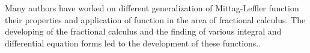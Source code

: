 \documentclass[a4paper,12pt]{article}
\theoremstyle{remark}
\begin{document}
Many authors have worked on different generalization of Mittag-Leffler function their properties and application of function in the area of fractional calculus. %
The developing of the fractional calculus and the finding of various integral and differential equation forms led to the development of these functions.\cite{gorenflo2014}.
        
\end{document}
